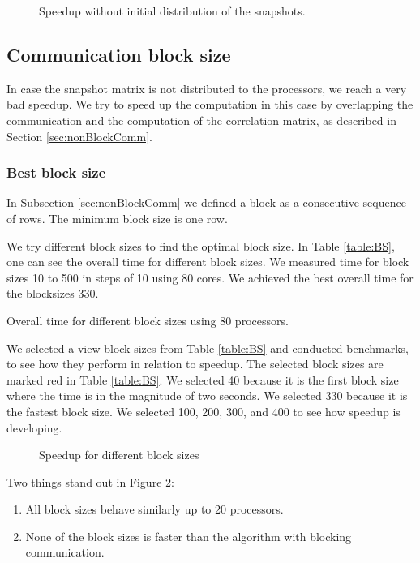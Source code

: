 \begin{figure}[H]
	\centering
	
	\caption{Speedup without initial distribution of the snapshots.}
	\label{fig:bench1}
\end{figure}


\newpage
\subsection{Communication block size}
In case the snapshot matrix is not distributed to the processors, we reach a very bad speedup.
We try to speed up the computation in this case by overlapping the communication and the computation of the correlation matrix, as described in Section \ref{sec:nonBlockComm}. 
\subsubsection{Best block size}
In Subsection \ref{sec:nonBlockComm} we defined a block as a consecutive sequence of rows.
The minimum block size is one row. 

We try different block sizes to find the optimal block size.
In Table \ref{table:BS}, one can see the overall time for different block sizes.
We measured time for block sizes 10 to 500 in steps of 10 using 80 cores.
We achieved the best overall time for the blocksizes $330$.

\begin{table}[H]
	\centering
	
	\caption{Overall time for different block sizes using 80 processors.}
	\label{table:BS}
\end{table}

We selected a view block sizes from Table \ref{table:BS} and conducted benchmarks, to see how they perform in relation to speedup.
The selected block sizes are marked red in Table \ref{table:BS}.
We selected 40 because it is the first block size where the time is in the magnitude of two seconds.
We selected 330 because it is the fastest block size.
We selected 100, 200, 300, and 400 to see how speedup is developing.


\begin{figure}[H]
	\centering
	
	\caption{Speedup for different block sizes }
	\label{fig:bench3}
\end{figure}

Two things stand out in Figure \ref{fig:bench3}:
\begin{enumerate}
	\item All block sizes behave similarly up to 20 processors. 
	\item None of the block sizes is faster than the algorithm with blocking communication.
\end{enumerate}

